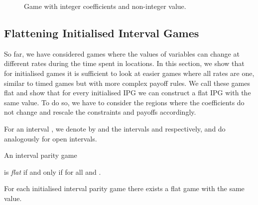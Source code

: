 \documentclass[fleqn,envcountsame]{LMCS}
\begin{document}
\begin{figure}[h]
\begin{center}
\end{center}
\caption{Game with integer coefficients and non-integer value.}
\label{fig-game-half-example}
\end{figure}

\subsection{Flattening Initialised Interval Games} \label{subsec_flat}
So far, we have considered games where the values of variables can change at
different rates during the time spent in locations. In this section,
we show that for initialised games it is sufficient to look at easier
games where all rates are one, similar to timed games but with more
complex payoff rules. We call these games flat and show that for every 
initialised IPG we can construct a flat IPG with the same value.
To do so, we have to consider the regions where the coefficients do not
change and rescale the constraints and payoffs accordingly.

For an interval , we denote by 
and  the intervals  and 
respectively, and do analogously for open intervals. 

\begin{defi}
An interval parity game 

is \emph{flat} if and only if 
for all  and .
\end{defi}

\begin{lem} \label{flat}
For each initialised interval parity game  there exists
a flat game  with the same value.
\end{lem}
\end{document}

